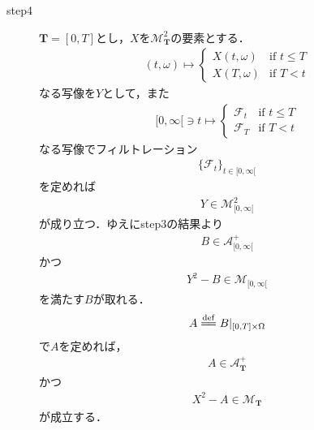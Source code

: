 \begin{sketch}
\begin{description}
			\item[step4]
				$\mathbf{T}=[0,T]$とし，$X$を$\mathscr{M}^2_{\mathbf{T}}$の要素とする．
				\begin{align}
					(t,\omega) \longmapsto
					\begin{cases}
						X(t,\omega) & \mbox{if } t \leq T \\
						X(T,\omega) & \mbox{if } T < t
					\end{cases}
				\end{align}
				なる写像を$Y$として，また
				\begin{align}
					[0,\infty[ \ni t \longmapsto 
					\begin{cases}
						\mathscr{F}_t & \mbox{if } t \leq T \\
						\mathscr{F}_T & \mbox{if } T < t
					\end{cases}
				\end{align}
				なる写像でフィルトレーション
				\begin{align}
					\{\mathscr{F}_t\}_{t \in [0,\infty[}
				\end{align}
				を定めれば
				\begin{align}
					Y \in \mathscr{M}^2_{[0,\infty[}
				\end{align}
				が成り立つ．ゆえにstep3の結果より
				\begin{align}
					B \in \mathscr{A}^+_{[0,\infty[}
				\end{align}
				かつ
				\begin{align}
					Y^2 - B \in \mathscr{M}_{[0,\infty[}
				\end{align}
				を満たす$B$が取れる．
				\begin{align}
					A \defeq B|_{[0,T] \times \Omega}
				\end{align}
				で$A$を定めれば，
				\begin{align}
					A \in \mathscr{A}^+_{\mathbf{T}}
				\end{align}
				かつ
				\begin{align}
					X^2 - A \in \mathscr{M}_{\mathbf{T}}
				\end{align}
				が成立する．
				\QED
		\end{description}
	\end{sketch}